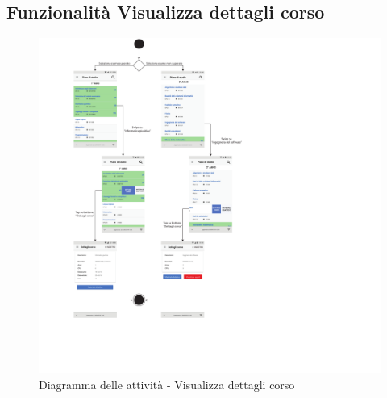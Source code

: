 \subsection{Funzionalità Visualizza dettagli corso}

\begin{figure} [h]
	\centering
	\includegraphics[width=7in]{imgs/gruppo1/activity_diagrams/AD5_visualizza_dettagli_corso.pdf}
	\caption{Diagramma delle attività - Visualizza dettagli corso}
	\label{diag:visualizzaDettagliCorsoAD}
\end{figure}
\clearpage